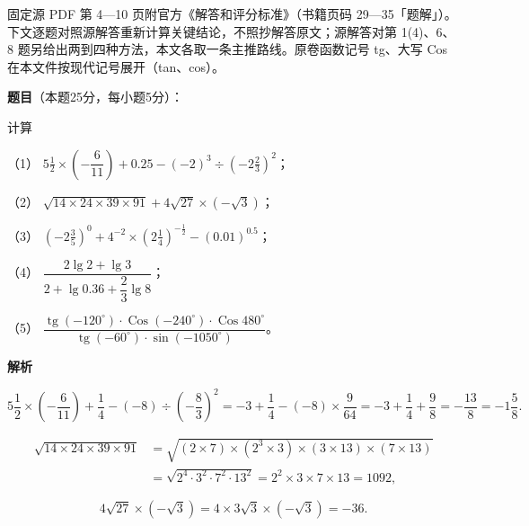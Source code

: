 

\begin{gktip}
固定源 PDF 第 4—10 页附官方《解答和评分标准》（书籍页码 29—35「题解」）。下文逐题对照源解答重新计算关键结论，不照抄解答原文；源解答对第 1(4)、6、8 题另给出两到四种方法，本文各取一条主推路线。原卷函数记号 tg、大写 Cos 在本文件按现代记号展开（tan、cos）。
\end{gktip}

\begin{answer}

\textbf{题目}（本题25分，每小题5分）：

计算

（1） $5\frac{1}{2}\times\left(-\dfrac{6}{11}\right)+0.25-(-2)^3\div\left(-2\frac{2}{3}\right)^2$；

（2） $\sqrt{14\times24\times39\times91}+4\sqrt{27}\times(-\sqrt3)$；

（3） $\left(-2\frac{3}{5}\right)^0+4^{-2}\times\left(2\frac{1}{4}\right)^{-\frac{1}{2}}-(0.01)^{0.5}$；

（4） $\dfrac{2\lg2+\lg3}{2+\lg0.36+\dfrac{2}{3}\lg8}$；

（5） $\dfrac{\operatorname{tg}(-120^\circ)\cdot\operatorname{Cos}(-240^\circ)\cdot\operatorname{Cos}480^\circ}{\operatorname{tg}(-60^\circ)\cdot\sin(-1050^\circ)}$。

\textbf{解析}


\nopagebreak[4]
\[
5\frac{1}{2}\times\left(-\frac{6}{11}\right)+\frac{1}{4}-(-8)\div\left(-\frac{8}{3}\right)^2
=-3+\frac{1}{4}-(-8)\times\frac{9}{64}
=-3+\frac{1}{4}+\frac{9}{8}=-\frac{13}{8}=-1\frac{5}{8}.
\]


\nopagebreak[4]
\[
\begin{aligned}
\sqrt{14\times24\times39\times91}
&=\sqrt{(2\times7)\times(2^3\times3)\times(3\times13)\times(7\times13)}\\
&=\sqrt{2^4\cdot3^2\cdot7^2\cdot13^2}=2^2\times3\times7\times13=1092,
\end{aligned}
\]

\nopagebreak[4]
\[
4\sqrt{27}\times(-\sqrt3)=4\times3\sqrt3\times(-\sqrt3)=-36.
\]


\end{answer}
